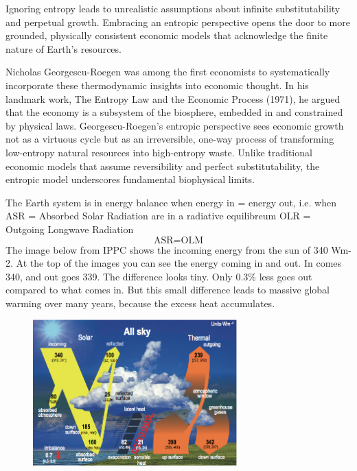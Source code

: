 \documentclass[a4paper,12pt]{article}
\begin{document}
Ignoring entropy leads to unrealistic assumptions about infinite substitutability and perpetual growth. Embracing an entropic perspective opens the door to more grounded, physically consistent economic models that acknowledge the finite nature of Earth's resources.

Nicholas Georgescu-Roegen was among the first economists to systematically incorporate these thermodynamic insights into economic thought. In his landmark work, The Entropy Law and the Economic Process (1971), he argued that the economy is a subsystem of the biosphere, embedded in and constrained by physical laws. Georgescu-Roegen's entropic perspective sees economic growth not as a virtuous cycle but as an irreversible, one-way process of transforming low-entropy natural resources into high-entropy waste. Unlike traditional economic models that assume reversibility and perfect substitutability, the entropic model underscores fundamental biophysical limits.

The Earth system is in energy balance when energy in = energy out, i.e. when ASR = Absorbed Solar Radiation are in a radiative equilibreum OLR = Outgoing Longwave Radiation
\[
\text{ASR} = \text{OLM}
\]
The image below from IPPC shows the incoming energy from the sun of 340 Wm-2. At the top of the images you can see the energy coming in and out. In comes 340, and out goes 339. The difference looks tiny. Only 0.3$\%$ less goes out compared to what comes in. But this small difference leads to massive global warming over many years, because the excess heat accumulates.

\begin{figure}[H] %
    \centering
    \includegraphics[width=0.7\textwidth]{figures/ecophysics.png} %
    \label{fig:energy-balance}
\end{figure}
\end{document}
